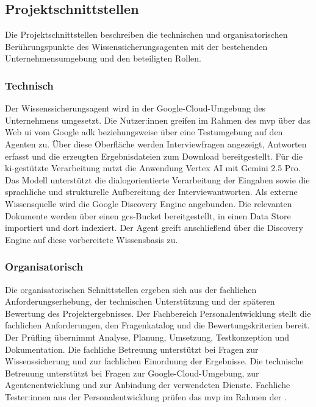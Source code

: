 \documentclass[
  10pt,
  ngerman,
  a4paper,
  toc=graduated,
  numbers=noenddot,
  headings=standardclasses,
  nonumberlist
]{scrartcl}
\begin{document}
\subsection{Projektschnittstellen}
\label{projektschnittstellen}
Die Projektschnittstellen beschreiben die technischen und organisatorischen Berührungspunkte des Wissenssicherungsagenten mit der bestehenden Unternehmensumgebung und den beteiligten Rollen.

\subsubsection{Technisch}
\label{technische_projektschnittstellen}

Der Wissenssicherungsagent wird in der Google-Cloud-Umgebung des Unternehmens umgesetzt. Die Nutzer:innen greifen im Rahmen des \gls{mvp} über das Web \gls{ui} vom Google \gls{adk} beziehungsweise über eine Testumgebung auf den Agenten zu. Über diese Oberfläche werden Interviewfragen angezeigt, Antworten erfasst und die erzeugten Ergebnisdateien zum Download bereitgestellt. Für die \gls{ki}-gestützte Verarbeitung nutzt die Anwendung Vertex AI mit Gemini 2.5 Pro. Das Modell unterstützt die dialogorientierte Verarbeitung der Eingaben sowie die sprachliche und strukturelle Aufbereitung der Interviewantworten. Als externe Wissensquelle wird die Google Discovery Engine angebunden. Die relevanten Dokumente werden über einen \gls{gcs}-Bucket bereitgestellt, in einen Data Store importiert und dort indexiert. Der Agent greift anschließend über die Discovery Engine auf diese vorbereitete Wissensbasis zu.

\subsubsection{Organisatorisch}
\label{organisatorische_projektschnittstellen}
Die organisatorischen Schnittstellen ergeben sich aus der fachlichen Anforderungserhebung, der technischen Unterstützung und der späteren Bewertung des Projektergebnisses. Der Fachbereich Personalentwicklung stellt die fachlichen Anforderungen, den Fragenkatalog und die Bewertungskriterien bereit. Der Prüfling übernimmt Analyse, Planung, Umsetzung, Testkonzeption und Dokumentation. Die fachliche Betreuung unterstützt bei Fragen zur Wissenssicherung und zur fachlichen Einordnung der Ergebnisse. Die technische Betreuung unterstützt bei Fragen zur Google-Cloud-Umgebung, zur Agentenentwicklung und zur Anbindung der verwendeten Dienste. 
Fachliche Tester:innen aus der Personalentwicklung prüfen das \gls{mvp} im Rahmen der .
\end{document}
